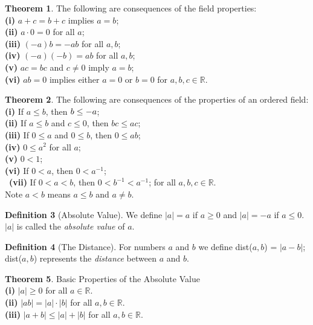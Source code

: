 \documentclass{book}
\theoremstyle{definition}
\newtheorem{definition}{Definition}[section]
\newtheorem{theorem}[definition]{Theorem}
\begin{document}
\begin{theorem}
The following are consequences of the field properties:
\\ \textbf{(i)} $a+c=b+c$ implies $a=b$;
\\ \textbf{(ii)} $a \cdot 0 = 0$ for all $a$;
\\ \textbf{(iii)} $(-a)b=-ab$ for all $a,b$;
\\ \textbf{(iv)} $(-a)(-b)=ab$ for all $a,b$;
\\ \textbf{(v)} $ac=bc$ and $c \neq 0$ imply $a=b$;
\\ \textbf{(vi)} $ab=0$ implies either $a=0$ or $b=0$ for $a,b,c \in \mathbb{R}$.
\end{theorem}
\begin{theorem}
The following are consequences of the properties of an ordered field:
\\ \textbf{(i)} If $a \leq b$, then $\-b \leq -a$;
\\ \textbf{(ii)} If $a \leq b$ and $c \leq 0$, then $bc \leq ac$;
\\ \textbf{(iii)} If $0 \leq a$ and $0 \leq b$, then $0 \leq ab$;
\\ \textbf{(iv)} $0 \leq a^2$ for all $a$;
\\ \textbf{(v)} $0 < 1$;
\\ \textbf{(vi)} If $0 < a$, then $0 < a^{-1}$;
\\\ \textbf{(vii)} If $0 < a < b$, then $0 < b^{-1} < a^{-1}$; for all $a,b,c \in \mathbb{R}$.
\\ Note $a<b$ means $a \leq b$ and $a \neq b$.
\end{theorem}
\begin{definition}[Absolute Value]
We define $|a| = a$ if $a \geq 0$ and $|a| = -a$ if $a \leq 0$.
\\ $|a|$ is called the \textit{absolute value} of $a$.
\end{definition}
\begin{definition}[The Distance]
For numbers $a$ and $b$ we define dist($a,b$) = $|a-b|$; dist($a,b$) represents the \textit{distance} between $a$ and $b$.
\end{definition}
\begin{theorem}
Basic Properties of the Absolute Value
\\ \textbf{(i)} $|a| \geq 0$ for all $a \in \mathbb{R}$.
\\ \textbf{(ii)} $|ab| = |a| \cdot |b|$ for all $a,b \in \mathbb{R}$.
\\ \textbf{(iii)} $|a+b| \leq |a| + |b|$ for all $a,b \in \mathbb{R}$.
\end{theorem}
\end{document}
